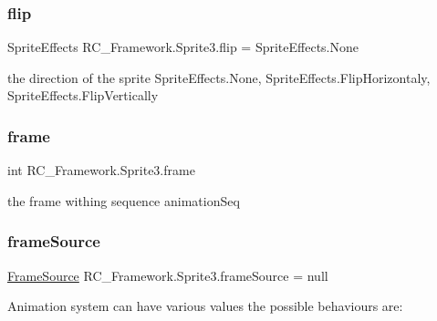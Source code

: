 \subsubsection{\texorpdfstring{flip}{flip}}
{\footnotesize\ttfamily Sprite\+Effects R\+C\+\_\+\+Framework.\+Sprite3.\+flip = Sprite\+Effects.\+None}



the direction of the sprite Sprite\+Effects.\+None, Sprite\+Effects.\+Flip\+Horizontaly, Sprite\+Effects.\+Flip\+Vertically 

\mbox{\label{class_r_c___framework_1_1_sprite3_a51a88ce97928314b06f83ce2ab6cd04f}} 
\subsubsection{\texorpdfstring{frame}{frame}}
{\footnotesize\ttfamily int R\+C\+\_\+\+Framework.\+Sprite3.\+frame\hspace{0.3cm}{\ttfamily [protected]}}



the frame withing sequence \textquotesingle{}animation\+Seq\textquotesingle{} 

\mbox{\label{class_r_c___framework_1_1_sprite3_a052b6b4879f526456238accb371373a0}} 
\subsubsection{\texorpdfstring{frame\+Source}{frameSource}}
{\footnotesize\ttfamily \mbox{\hyperlink{class_r_c___framework_1_1_frame_source}{Frame\+Source}} R\+C\+\_\+\+Framework.\+Sprite3.\+frame\+Source = null}



Animation system can have various values the possible behaviours are\+: 


